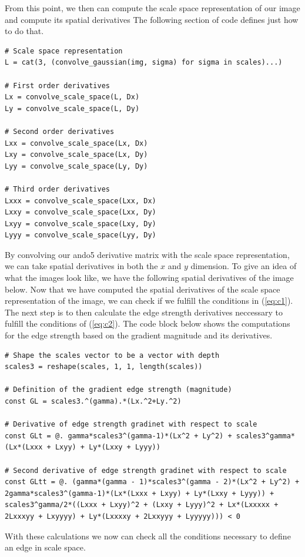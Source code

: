 \documentclass{article}
\begin{document}
From this point, we then can compute the scale space representation of our image and compute its spatial derivatives
The following section of code defines just how to do that.
\begin{lstlisting}
# Scale space representation
L = cat(3, (convolve_gaussian(img, sigma) for sigma in scales)...)

# First order derivatives
Lx = convolve_scale_space(L, Dx)
Ly = convolve_scale_space(L, Dy)

# Second order derivatives
Lxx = convolve_scale_space(Lx, Dx)
Lxy = convolve_scale_space(Lx, Dy)
Lyy = convolve_scale_space(Ly, Dy)

# Third order derivatives
Lxxx = convolve_scale_space(Lxx, Dx)
Lxxy = convolve_scale_space(Lxx, Dy)
Lxyy = convolve_scale_space(Lxy, Dy)
Lyyy = convolve_scale_space(Lyy, Dy)
\end{lstlisting}
By convolving our ando5 derivative matrix with the scale space representation, we can take spatial derivatives in both the $x$ and $y$ dimension. To give an idea of what the images look like, we have the following spatial derivatives of the image below.
Now that we have computed the spatial derivatives of the scale space representation of the image, we can check if we fulfill the conditions in (\ref{eq:c1}). 
The next step is to then calculate the edge strength derivatives neccessary to fulfill the conditions of (\ref{eq:c2}).
The code block below shows the computations for the edge strength based on the gradient magnitude and its derivatives.
\begin{lstlisting}
# Shape the scales vector to be a vector with depth
scales3 = reshape(scales, 1, 1, length(scales))

# Definition of the gradient edge strength (magnitude)
const GL = scales3.^(gamma).*(Lx.^2+Ly.^2)

# Derivative of edge strength gradinet with respect to scale
const GLt = @. gamma*scales3^(gamma-1)*(Lx^2 + Ly^2) + scales3^gamma*(Lx*(Lxxx + Lxyy) + Ly*(Lxxy + Lyyy))

# Second derivative of edge strength gradinet with respect to scale
const GLtt = @. (gamma*(gamma - 1)*scales3^(gamma - 2)*(Lx^2 + Ly^2) + 2gamma*scales3^(gamma-1)*(Lx*(Lxxx + Lxyy) + Ly*(Lxxy + Lyyy)) + scales3^gamma/2*((Lxxx + Lxyy)^2 + (Lxxy + Lyyy)^2 + Lx*(Lxxxxx + 2Lxxxyy + Lxyyyy) + Ly*(Lxxxxy + 2Lxxyyy + Lyyyyy))) < 0
\end{lstlisting}
With these calculations we now can check all the conditions necessary to define an edge in scale space. 
\end{document}

